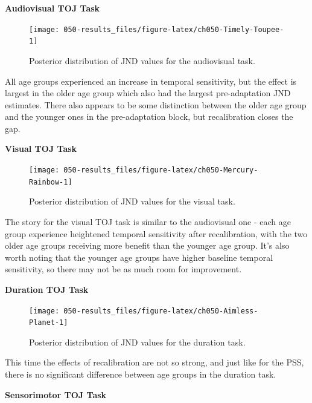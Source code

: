 \documentclass[11pt, oneside, openany]{scrbook}
\begin{document}
\textbf{Audiovisual TOJ Task}

\begin{figure}

{\centering \texttt{[image: 050-results\_files/figure-latex/ch050-Timely-Toupee-1]} 

}

\caption{Posterior distribution of JND values for the audiovisual task.}\label{fig:ch050-Timely-Toupee}
\end{figure}

All age groups experienced an increase in temporal sensitivity, but the effect is largest in the older age group which also had the largest pre-adaptation JND estimates. There also appears to be some distinction between the older age group and the younger ones in the pre-adaptation block, but recalibration closes the gap.

\textbf{Visual TOJ Task}

\begin{figure}

{\centering \texttt{[image: 050-results\_files/figure-latex/ch050-Mercury-Rainbow-1]} 

}

\caption{Posterior distribution of JND values for the visual task.}\label{fig:ch050-Mercury-Rainbow}
\end{figure}

The story for the visual TOJ task is similar to the audiovisual one - each age group experience heightened temporal sensitivity after recalibration, with the two older age groups receiving more benefit than the younger age group. It's also worth noting that the younger age groups have higher baseline temporal sensitivity, so there may not be as much room for improvement.

\textbf{Duration TOJ Task}

\begin{figure}

{\centering \texttt{[image: 050-results\_files/figure-latex/ch050-Aimless-Planet-1]} 

}

\caption{Posterior distribution of JND values for the duration task.}\label{fig:ch050-Aimless-Planet}
\end{figure}

This time the effects of recalibration are not so strong, and just like for the PSS, there is no significant difference between age groups in the duration task.

\textbf{Sensorimotor TOJ Task}
\end{document}
